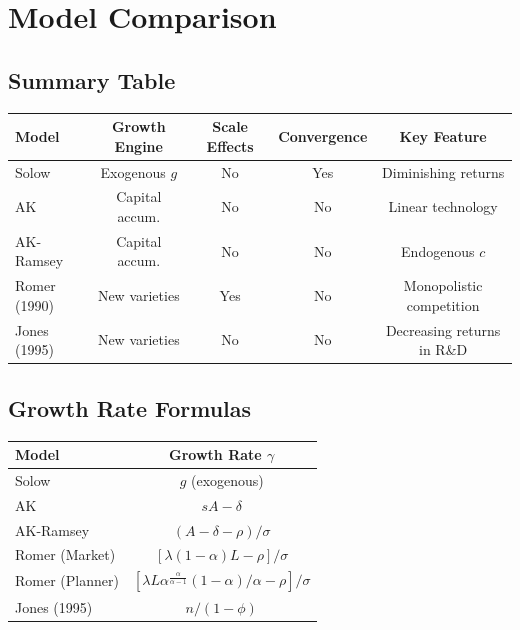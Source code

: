 \documentclass[a4paper,11pt]{article}
\begin{document}
\clearpage

\section{Model Comparison}

\subsection*{Summary Table}
\begin{center}
\begin{tabular}{lcccc}
\toprule
Model & Growth Engine & Scale Effects & Convergence & Key Feature \\
\midrule
Solow & Exogenous $g$ & No & Yes & Diminishing returns \\
AK & Capital accum. & No & No & Linear technology \\
AK-Ramsey & Capital accum. & No & No & Endogenous $c$ \\
Romer (1990) & New varieties & Yes & No & Monopolistic competition \\
Jones (1995) & New varieties & No & No & Decreasing returns in R\&D \\
\bottomrule
\end{tabular}
\end{center}

\subsection*{Growth Rate Formulas}
\begin{center}
\begin{tabular}{lc}
\toprule
Model & Growth Rate $\gamma$ \\
\midrule
Solow & $g$ (exogenous) \\
AK & $sA - \delta$ \\
AK-Ramsey & $(A - \delta - \rho) / \sigma$ \\
Romer (Market) & $[\lambda(1-\alpha)L - \rho] / \sigma$ \\
Romer (Planner) & $[\lambda L \alpha^{\frac{\alpha}{\alpha-1}}(1-\alpha) / \alpha - \rho] / \sigma$ \\
Jones (1995) & $n / (1-\phi)$ \\
\bottomrule
\end{tabular}
\end{center}
\end{document}
